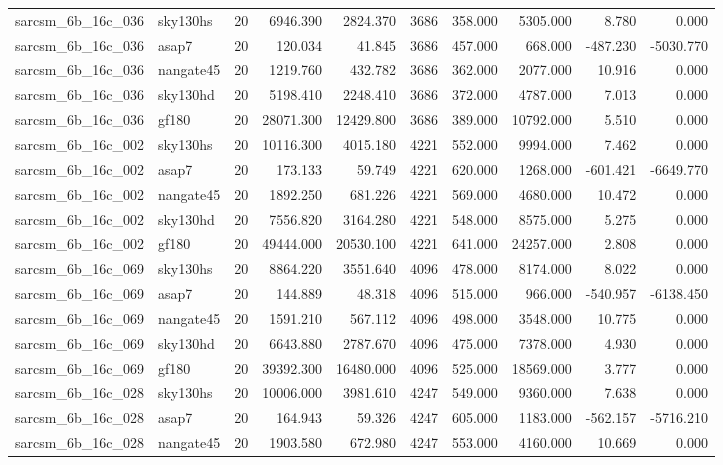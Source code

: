 \begin{tabular}{llrrrrrrrr}
sarcsm\_6b\_16c\_036 & sky130hs & 20 & 6946.390 & 2824.370 & 3686 & 358.000 & 5305.000 & 8.780 & 0.000 \\
sarcsm\_6b\_16c\_036 & asap7 & 20 & 120.034 & 41.845 & 3686 & 457.000 & 668.000 & -487.230 & -5030.770 \\
sarcsm\_6b\_16c\_036 & nangate45 & 20 & 1219.760 & 432.782 & 3686 & 362.000 & 2077.000 & 10.916 & 0.000 \\
sarcsm\_6b\_16c\_036 & sky130hd & 20 & 5198.410 & 2248.410 & 3686 & 372.000 & 4787.000 & 7.013 & 0.000 \\
sarcsm\_6b\_16c\_036 & gf180 & 20 & 28071.300 & 12429.800 & 3686 & 389.000 & 10792.000 & 5.510 & 0.000 \\
sarcsm\_6b\_16c\_002 & sky130hs & 20 & 10116.300 & 4015.180 & 4221 & 552.000 & 9994.000 & 7.462 & 0.000 \\
sarcsm\_6b\_16c\_002 & asap7 & 20 & 173.133 & 59.749 & 4221 & 620.000 & 1268.000 & -601.421 & -6649.770 \\
sarcsm\_6b\_16c\_002 & nangate45 & 20 & 1892.250 & 681.226 & 4221 & 569.000 & 4680.000 & 10.472 & 0.000 \\
sarcsm\_6b\_16c\_002 & sky130hd & 20 & 7556.820 & 3164.280 & 4221 & 548.000 & 8575.000 & 5.275 & 0.000 \\
sarcsm\_6b\_16c\_002 & gf180 & 20 & 49444.000 & 20530.100 & 4221 & 641.000 & 24257.000 & 2.808 & 0.000 \\
sarcsm\_6b\_16c\_069 & sky130hs & 20 & 8864.220 & 3551.640 & 4096 & 478.000 & 8174.000 & 8.022 & 0.000 \\
sarcsm\_6b\_16c\_069 & asap7 & 20 & 144.889 & 48.318 & 4096 & 515.000 & 966.000 & -540.957 & -6138.450 \\
sarcsm\_6b\_16c\_069 & nangate45 & 20 & 1591.210 & 567.112 & 4096 & 498.000 & 3548.000 & 10.775 & 0.000 \\
sarcsm\_6b\_16c\_069 & sky130hd & 20 & 6643.880 & 2787.670 & 4096 & 475.000 & 7378.000 & 4.930 & 0.000 \\
sarcsm\_6b\_16c\_069 & gf180 & 20 & 39392.300 & 16480.000 & 4096 & 525.000 & 18569.000 & 3.777 & 0.000 \\
sarcsm\_6b\_16c\_028 & sky130hs & 20 & 10006.000 & 3981.610 & 4247 & 549.000 & 9360.000 & 7.638 & 0.000 \\
sarcsm\_6b\_16c\_028 & asap7 & 20 & 164.943 & 59.326 & 4247 & 605.000 & 1183.000 & -562.157 & -5716.210 \\
sarcsm\_6b\_16c\_028 & nangate45 & 20 & 1903.580 & 672.980 & 4247 & 553.000 & 4160.000 & 10.669 & 0.000 \\

\end{tabular}
